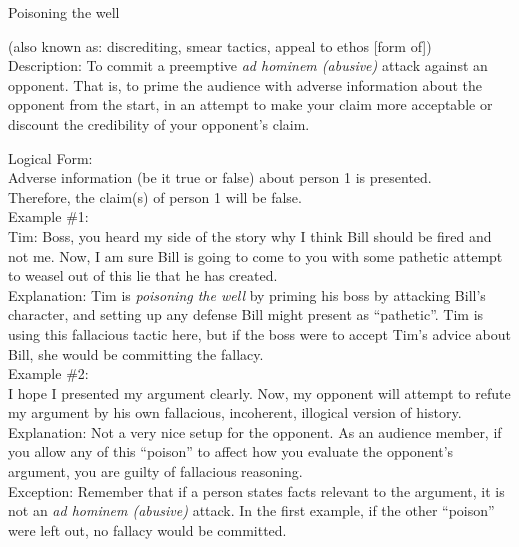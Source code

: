 \documentclass[a4paper,12pt,single,pdftex]{scrbook}
\begin{document}
  

Poisoning the well
    
      (also known as: discrediting, smear tactics, appeal to ethos [form of])
    \\

  
    Description: To commit a preemptive {\it ad hominem (abusive)}  attack against an opponent.  That is, to prime the audience with adverse information about the opponent from the start, in an attempt to make your claim more acceptable or discount the credibility of your opponent’s claim.

    
      Logical Form:
    \\

    
      Adverse information (be it true or false) about person 1 is presented.
    \\

    
      Therefore, the claim(s) of person 1 will be false.
    \\

    
      Example \#1:
    \\

    
      Tim: Boss, you heard my side of the story why I think Bill should be fired and not me.  Now, I am sure Bill is going to come to you with some pathetic attempt to weasel out of this lie that he has created.
    \\

    
      Explanation: Tim is {\it poisoning the well} by priming his boss by attacking Bill’s character, and setting up any defense Bill might present as “pathetic”.  Tim is using this fallacious tactic here, but if the boss were to accept Tim’s advice about Bill, she would be committing the fallacy.
    \\

    
      Example \#2:
    \\

    
      I hope I presented my argument clearly.  Now, my opponent will attempt to refute my argument by his own fallacious, incoherent, illogical version of history.
    \\

    
      Explanation: Not a very nice setup for the opponent.  As an audience member, if you allow any of this “poison” to affect how you evaluate the opponent’s argument, you are guilty of fallacious reasoning.
    \\

    
      Exception: Remember that if a person states facts relevant to the argument, it is not an {\it ad hominem (abusive)} attack.  In the first example, if the other “poison” were left out, no fallacy would be committed.
    \\
\end{document}

